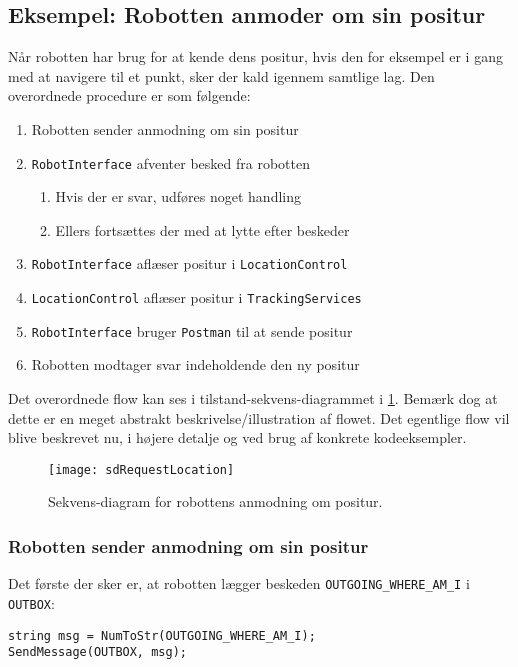 \subsection{Eksempel: Robotten anmoder om sin positur}
Når robotten har brug for at kende dens positur, hvis den for eksempel er i gang med at navigere til et punkt, sker der kald igennem samtlige lag.
Den overordnede procedure er som følgende:
\begin{enumerate}
\item{Robotten sender anmodning om sin positur}
\item{\lstinline[style=csharp]!RobotInterface! afventer besked fra robotten}
\begin{enumerate}
\item{Hvis der er svar, udføres noget handling}
\item{Ellers fortsættes der med at lytte efter beskeder}
\end{enumerate}
\item{\lstinline[style=csharp]!RobotInterface! aflæser positur i \lstinline[style=csharp]!LocationControl!}
\item{\lstinline[style=csharp]!LocationControl! aflæser positur i \lstinline[style=csharp]!TrackingServices!}
\item{\lstinline[style=csharp]!RobotInterface! bruger \lstinline[style=csharp]!Postman! til at sende positur}
\item{Robotten modtager svar indeholdende den ny positur}
\end{enumerate}
Det overordnede flow kan ses i tilstand-sekvens-diagrammet i \cref{flow:ssd}.
Bemærk dog at dette er en meget abstrakt beskrivelse/illustration af flowet.
Det egentlige flow vil blive beskrevet nu, i højere detalje og ved brug af konkrete kodeeksempler.

\begin{figure}[H]
\centering
\texttt{[image: sdRequestLocation]}
\caption{Sekvens-diagram for robottens anmodning om positur.}
\label{flow:ssd}
\end{figure}

\subsubsection{Robotten sender anmodning om sin positur}
Det første der sker er, at robotten lægger beskeden \lstinline[style=c]!OUTGOING_WHERE_AM_I! i \lstinline[style=c]!OUTBOX!:

\begin{lstlisting}[style=csmall,label=lst:whereami_request,caption=Robotten sender anmodning om positur.]
string msg = NumToStr(OUTGOING_WHERE_AM_I);
SendMessage(OUTBOX, msg);
\end{lstlisting}

